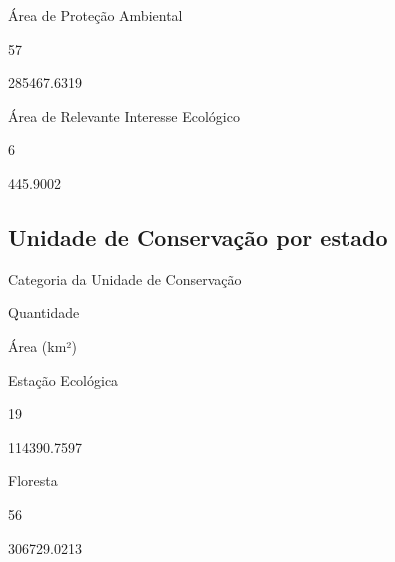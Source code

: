 \documentclass[
  letterpaper,
]{report}
\begin{document}
\n    

\n      

Área de Proteção Ambiental

\n      

57

\n      

285467.6319

\n    

\n    

\n      

Área de Relevante Interesse Ecológico

\n      

6

\n      

445.9002

\n    

\n  

\n

\hypertarget{unidade-de-conservauxe7uxe3o-por-estado}{%
\subsection{Unidade de Conservação por
estado}\label{unidade-de-conservauxe7uxe3o-por-estado}}

\n  

\n    

\n      

Categoria da Unidade de Conservação

\n      

Quantidade

\n      

Área (km²)

\n    

\n  

\n  

\n    

\n      

Estação Ecológica

\n      

19

\n      

114390.7597

\n    

\n    

\n      

Floresta

\n      

56

\n      

306729.0213

\n    
\end{document}
